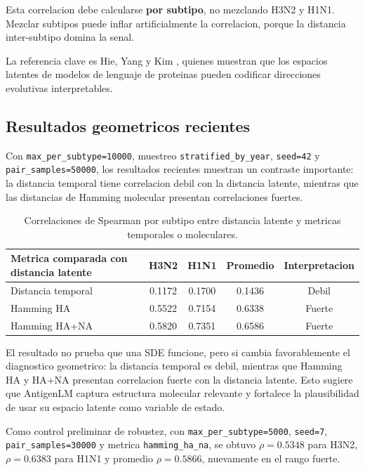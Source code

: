 \documentclass[12pt,letterpaper]{article}
\begin{document}
Esta correlacion debe calcularse \textbf{por subtipo}, no mezclando H3N2 y H1N1. Mezclar subtipos puede inflar artificialmente la correlacion, porque la distancia inter-subtipo domina la senal.

La referencia clave es Hie, Yang y Kim \cite{hie2022evolutionary}, quienes muestran que los espacios latentes de modelos de lenguaje de proteinas pueden codificar direcciones evolutivas interpretables.

\subsection{Resultados geometricos recientes}

Con \texttt{max\_per\_subtype=10000}, muestreo \texttt{stratified\_by\_year}, \texttt{seed=42} y \texttt{pair\_samples=50000}, los resultados recientes muestran un contraste importante: la distancia temporal tiene correlacion debil con la distancia latente, mientras que las distancias de Hamming molecular presentan correlaciones fuertes.

\begin{table}[h!]
\centering
\renewcommand{\arraystretch}{1.15}
\begin{tabular}{lcccc}
\toprule
Metrica comparada con distancia latente & H3N2 & H1N1 & Promedio & Interpretacion \\
\midrule
Distancia temporal & 0.1172 & 0.1700 & 0.1436 & Debil \\
Hamming HA & 0.5522 & 0.7154 & 0.6338 & Fuerte \\
Hamming HA+NA & 0.5820 & 0.7351 & 0.6586 & Fuerte \\
\bottomrule
\end{tabular}
\caption{Correlaciones de Spearman por subtipo entre distancia latente y metricas temporales o moleculares.}
\label{tab:spearman-geometria-reciente}
\end{table}

El resultado no prueba que una SDE funcione, pero si cambia favorablemente el diagnostico geometrico: la distancia temporal es debil, mientras que Hamming HA y HA+NA presentan correlacion fuerte con la distancia latente. Esto sugiere que AntigenLM captura estructura molecular relevante y fortalece la plausibilidad de usar su espacio latente como variable de estado.

Como control preliminar de robustez, con \texttt{max\_per\_subtype=5000}, \texttt{seed=7}, \texttt{pair\_samples=30000} y metrica \texttt{hamming\_ha\_na}, se obtuvo $\rho=0.5348$ para H3N2, $\rho=0.6383$ para H1N1 y promedio $\rho=0.5866$, nuevamente en el rango fuerte.
\end{document}
